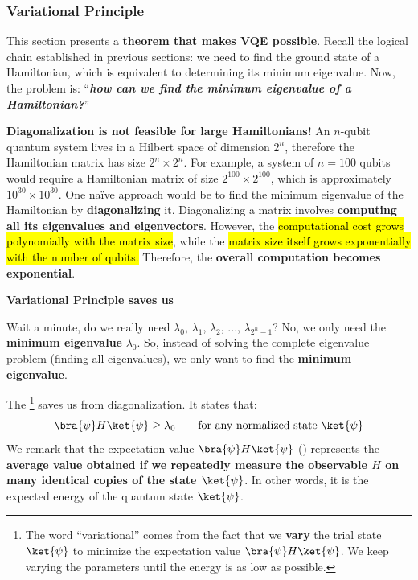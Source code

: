 \subsubsection{Variational Principle}\label{sec:variational-principle}

This section presents a \textbf{theorem that makes VQE possible}. Recall the logical chain established in previous sections: we need to find the ground state of a Hamiltonian, which is equivalent to determining its minimum eigenvalue. Now, the problem is: ``\emph{\textbf{how can we find the minimum eigenvalue of a Hamiltonian?}}''

\highspace
\textcolor{Red2}{ \textbf{Diagonalization is not feasible for large Hamiltonians!}} An $n$-qubit quantum system lives in a Hilbert space of dimension $2^{n}$, therefore the Hamiltonian matrix has size $2^{n} \times 2^{n}$. For example, a system of $n=100$ qubits would require a Hamiltonian matrix of size $2^{100} \times 2^{100}$, which is approximately $10^{30} \times 10^{30}$. One naïve approach would be to find the minimum eigenvalue of the Hamiltonian by \textbf{diagonalizing} it. Diagonalizing a matrix involves \textbf{computing all its eigenvalues and eigenvectors}. However, the \hl{computational cost grows polynomially with the matrix size}, while the \hl{matrix size itself grows exponentially with the number of qubits.} Therefore, the \textbf{overall computation becomes exponential}.

\highspace
\begin{flushleft}
    \textcolor{Green3}{ \textbf{Variational Principle saves us}}
\end{flushleft}
Wait a minute, do we really need $\lambda_0$, $\lambda_1$, $\lambda_2$, ..., $\lambda_{2^n-1}$? No, we only need the \textbf{minimum eigenvalue} $\lambda_0$. So, instead of solving the complete eigenvalue problem (finding all eigenvalues), we only want to find the \textbf{minimum eigenvalue}.

\highspace
The \footnote{%
    The word ``variational'' comes from the fact that we \textbf{vary} the trial state $\ket{\psi}$ to minimize the expectation value $\bra{\psi} H \ket{\psi}$. We keep varying the parameters until the energy is as low as possible.%
} saves us from diagonalization. It states that:
\begin{equation*}
    \bra{\psi} H \ket{\psi} \geq \lambda_0 \qquad \text{for any normalized state } \ket{\psi}
\end{equation*}
We remark that the expectation value $\bra{\psi} H \ket{\psi}$ () represents the \textbf{average value obtained if we repeatedly measure the observable $H$ on many identical copies of the state $\ket{\psi}$}. In other words, it is the expected energy of the quantum state $\ket{\psi}$.

